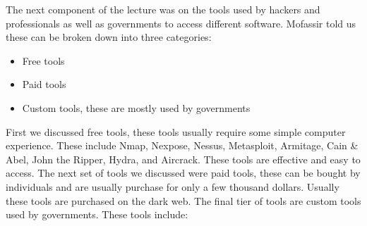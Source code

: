 \documentclass{article}
\begin{document}
The next component of the lecture was on the tools used by hackers and professionals as well as
governments to access different software. Mofassir told us these can be broken down into three
categories:

\begin{itemize}
    
    \item{Free tools}

    \item{Paid tools}

    \item{Custom tools, these are mostly used by governments}

\end{itemize}

First we discussed free tools, these tools usually require some simple computer experience. These
include Nmap, Nexpose, Nessus, Metasploit, Armitage, Cain \& Abel, John the Ripper, Hydra, and
Aircrack. These tools are effective and easy to access. The next set of tools we discussed were
paid tools, these can be bought by individuals and are usually purchase for only a few thousand
dollars. Usually these tools are purchased on the dark web. The final tier of tools are custom
tools used by governments. These tools include:

\newpage
\end{document}
